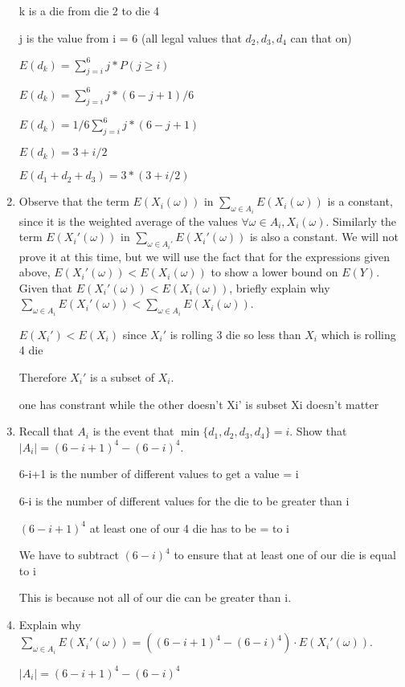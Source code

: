 \documentclass[12pt]{article}
\newcounter{ques}
\newenvironment{question}{\stepcounter{ques}{\noindent\bf Question \arabic{ques}:}}{\vspace{5mm}}
\begin{document}
\begin{question}
\begin{enumerate}
		k is a die from die 2 to die 4
		
		j is the value from i = 6 (all legal values that $d_2, d_3, d_4$ can that on)

		$E(d_k) = \sum_{j = i}^{6} j * P(j \geq i)$

		$E(d_k) = \sum_{j = i}^{6} j * (6-j+1)/6$

		$E(d_k) = 1/6 \sum_{j = i}^{6}  j * (6-j+1)$
	
		$E(d_k) = 3 + i/2$

		$E(d_1 + d_2 + d_3) = 3* (3 + i/2)$
		
		\item\label{given} Observe that the term $E(X_i(\omega))$ in $\sum_{\omega \in A_i} E(X_i(\omega))$ is a constant, since it is the weighted average of the values $\forall \omega \in A_i, X_i(\omega)$. Similarly the term $E(X_i'(\omega))$ in $\sum_{\omega \in A_i'} E(X_i'(\omega))$ is also a constant. We will not prove it at this time, but we will use the fact that for the expressions given above, $E(X_i'(\omega))<E(X_i(\omega))$ to show a lower bound on $E(Y)$. Given that $E(X_i'(\omega))<E(X_i(\omega))$, briefly explain why $\sum_{\omega \in A_i} E(X_i'(\omega))<\sum_{\omega \in A_i} E(X_i(\omega))$. 
		
		$E(X_i') < E(X_i)$ since $X_i'$ is rolling 3 die so less than $X_i$ which is rolling 4 die

		Therefore $X_i'$ is a subset of $X_i$.


		one has constrant while the other doesn't
		Xi' is subset
		Xi doesn't matter

		\item Recall that $A_i$ is the event that $\min\{d_1,d_2,d_3,d_4\}=i$. Show that $|A_i|= (6-i+1)^4-(6-i)^4$. 
		
		6-i+1 is the number of different values to get a value = i

		6-i is the number of different values for the die to be greater than i

		$(6-i+1)^4$ at least one of our 4 die has to be = to i

		We have to subtract $(6-i)^4$ to ensure that at least one of our die is equal to i

		This is because not all of our die can be greater than i.

		\item Explain why $\sum_{\omega \in A_i} E(X_i'(\omega)) = \left((6-i+1)^4-(6-i)^4\right)\cdot E(X_i'(\omega))$.
		
		$|A_i|= (6-i+1)^4-(6-i)^4$


\end{enumerate}
\end{question}
\end{document}

